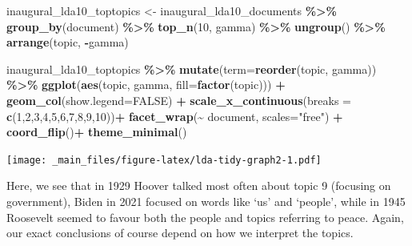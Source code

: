 \documentclass[
]{book}
\newenvironment{Shaded}{\begin{snugshade}}{\end{snugshade}}
\newcommand{\AttributeTok}[1]{\textcolor[rgb]{0.13,0.29,0.53}{#1}}
\newcommand{\ConstantTok}[1]{\textcolor[rgb]{0.56,0.35,0.01}{#1}}
\newcommand{\DecValTok}[1]{\textcolor[rgb]{0.00,0.00,0.81}{#1}}
\newcommand{\FunctionTok}[1]{\textcolor[rgb]{0.13,0.29,0.53}{\textbf{#1}}}
\newcommand{\NormalTok}[1]{#1}
\newcommand{\OtherTok}[1]{\textcolor[rgb]{0.56,0.35,0.01}{#1}}
\newcommand{\SpecialCharTok}[1]{\textcolor[rgb]{0.81,0.36,0.00}{\textbf{#1}}}
\newcommand{\StringTok}[1]{\textcolor[rgb]{0.31,0.60,0.02}{#1}}
\begin{document}
\begin{Shaded}
\begin{Highlighting}[]
\NormalTok{inaugural\_lda10\_toptopics }\OtherTok{\textless{}{-}}\NormalTok{ inaugural\_lda10\_documents }\SpecialCharTok{\%\textgreater{}\%}
 \FunctionTok{group\_by}\NormalTok{(document) }\SpecialCharTok{\%\textgreater{}\%}
 \FunctionTok{top\_n}\NormalTok{(}\DecValTok{10}\NormalTok{, gamma) }\SpecialCharTok{\%\textgreater{}\%}
 \FunctionTok{ungroup}\NormalTok{() }\SpecialCharTok{\%\textgreater{}\%}
 \FunctionTok{arrange}\NormalTok{(topic, }\SpecialCharTok{{-}}\NormalTok{gamma)}
\end{Highlighting}
\end{Shaded}

\begin{Shaded}
\begin{Highlighting}[]
\NormalTok{inaugural\_lda10\_toptopics }\SpecialCharTok{\%\textgreater{}\%}
 \FunctionTok{mutate}\NormalTok{(}\AttributeTok{term=}\FunctionTok{reorder}\NormalTok{(topic, gamma)) }\SpecialCharTok{\%\textgreater{}\%}
 \FunctionTok{ggplot}\NormalTok{(}\FunctionTok{aes}\NormalTok{(topic, gamma, }\AttributeTok{fill=}\FunctionTok{factor}\NormalTok{(topic))) }\SpecialCharTok{+}
 \FunctionTok{geom\_col}\NormalTok{(}\AttributeTok{show.legend=}\ConstantTok{FALSE}\NormalTok{) }\SpecialCharTok{+}
 \FunctionTok{scale\_x\_continuous}\NormalTok{(}\AttributeTok{breaks =} \FunctionTok{c}\NormalTok{(}\DecValTok{1}\NormalTok{,}\DecValTok{2}\NormalTok{,}\DecValTok{3}\NormalTok{,}\DecValTok{4}\NormalTok{,}\DecValTok{5}\NormalTok{,}\DecValTok{6}\NormalTok{,}\DecValTok{7}\NormalTok{,}\DecValTok{8}\NormalTok{,}\DecValTok{9}\NormalTok{,}\DecValTok{10}\NormalTok{))}\SpecialCharTok{+}
 \FunctionTok{facet\_wrap}\NormalTok{(}\SpecialCharTok{\textasciitilde{}}\NormalTok{ document, }\AttributeTok{scales=}\StringTok{"free"}\NormalTok{) }\SpecialCharTok{+}
 \FunctionTok{coord\_flip}\NormalTok{()}\SpecialCharTok{+}
 \FunctionTok{theme\_minimal}\NormalTok{()}
\end{Highlighting}
\end{Shaded}

\texttt{[image: \_main\_files/figure-latex/lda-tidy-graph2-1.pdf]}

Here, we see that in 1929 Hoover talked most often about topic 9 (focusing on government), Biden in 2021 focused on words like `us' and `people', while in 1945 Roosevelt seemed to favour both the people and topics referring to peace. Again, our exact conclusions of course depend on how we interpret the topics.
\end{document}
